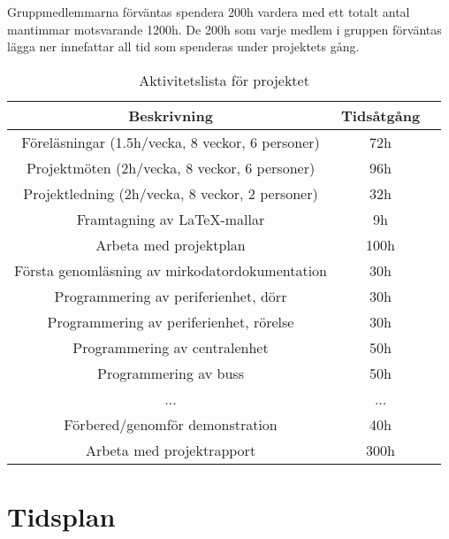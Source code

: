 \documentclass{article}
\begin{document}
Gruppmedlemmarna förväntas spendera 200h vardera med ett totalt antal mantimmar motsvarande 1200h. De 200h som varje medlem i gruppen förväntas lägga ner innefattar all tid som spenderas under projektets gång.

\begin{table}[!h]
    \begin{center}
    \begin{tabular}{ |c|c|c| }\hline
    Beskrivning & Tidsåtgång \\\hline\hline
    Föreläsningar (1.5h/vecka, 8 veckor, 6 personer) & 72h \\\hline
    Projektmöten (2h/vecka, 8 veckor, 6 personer) & 96h \\\hline
    Projektledning (2h/vecka, 8 veckor, 2 personer) & 32h \\\hline
    Framtagning av LaTeX-mallar & 9h \\\hline
    Arbeta med projektplan & 100h \\\hline
    Första genomläsning av mirkodatordokumentation & 30h \\\hline
    Programmering av periferienhet, dörr & 30h \\\hline
    Programmering av periferienhet, rörelse & 30h \\\hline
    Programmering av centralenhet & 50h \\\hline
    Programmering av buss & 50h \\\hline
    ... & ... \\\hline
    Förbered/genomför demonstration & 40h \\\hline
    Arbeta med projektrapport & 300h \\\hline
    \end{tabular}
    \caption{Aktivitetslista för projektet}
    \label{milstolpar}
    \end{center}
\end{table}

\section{Tidsplan}
\end{document}
